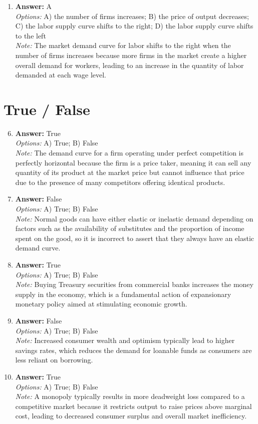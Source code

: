 \documentclass[12pt]{article}
\begin{document}
\begin{enumerate}[label=\arabic*.]
\item \textbf{Answer:} A
\\ \textit{Options:} A) the number of firms increases; B) the price of output decreases; C) the labor supply curve shifts to the right; D) the labor supply curve shifts to the left
\\ \textit{Note:} The market demand curve for labor shifts to the right when the number of firms increases because more firms in the market create a higher overall demand for workers, leading to an increase in the quantity of labor demanded at each wage level.
\end{enumerate}

\section*{True / False}
\begin{enumerate}[label=\arabic*.]
\setcounter{enumi}{5}
\item \textbf{Answer:} True
\\ \textit{Options:} A) True; B) False
\\ \textit{Note:} The demand curve for a firm operating under perfect competition is perfectly horizontal because the firm is a price taker, meaning it can sell any quantity of its product at the market price but cannot influence that price due to the presence of many competitors offering identical products.
\item \textbf{Answer:} False
\\ \textit{Options:} A) True; B) False
\\ \textit{Note:} Normal goods can have either elastic or inelastic demand depending on factors such as the availability of substitutes and the proportion of income spent on the good, so it is incorrect to assert that they always have an elastic demand curve.
\item \textbf{Answer:} True
\\ \textit{Options:} A) True; B) False
\\ \textit{Note:} Buying Treasury securities from commercial banks increases the money supply in the economy, which is a fundamental action of expansionary monetary policy aimed at stimulating economic growth.
\item \textbf{Answer:} False
\\ \textit{Options:} A) True; B) False
\\ \textit{Note:} Increased consumer wealth and optimism typically lead to higher savings rates, which reduces the demand for loanable funds as consumers are less reliant on borrowing.
\item \textbf{Answer:} True
\\ \textit{Options:} A) True; B) False
\\ \textit{Note:} A monopoly typically results in more deadweight loss compared to a competitive market because it restricts output to raise prices above marginal cost, leading to decreased consumer surplus and overall market inefficiency.
\end{enumerate}
\end{document}
